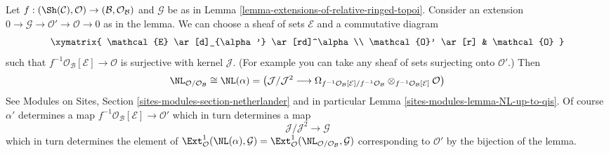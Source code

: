 \begin{remark}
\label{remark-extensions-of-relative-ringed-topoi}
Let $f : (\Sh(\mathcal{C}), \mathcal{O}) \to
(\mathcal{B}, \mathcal{O}_\mathcal{B})$ and $\mathcal{G}$
be as in Lemma \ref{lemma-extensions-of-relative-ringed-topoi}.
Consider an extension
$0 \to \mathcal{G} \to \mathcal{O}' \to \mathcal{O} \to 0$
as in the lemma. We can choose a sheaf of sets $\mathcal{E}$
and a commutative diagram
$$
\xymatrix{
\mathcal{E} \ar[d]_{\alpha'} \ar[rd]^\alpha \\
\mathcal{O}' \ar[r] & \mathcal{O}
}
$$
such that $f^{-1}\mathcal{O}_\mathcal{B}[\mathcal{E}] \to \mathcal{O}$
is surjective with kernel $\mathcal{J}$.
(For example you can take any sheaf of sets surjecting
onto $\mathcal{O}'$.) Then
$$
\NL_{\mathcal{O}/\mathcal{O}_\mathcal{B}} \cong \NL(\alpha) = 
\left(
\mathcal{J}/\mathcal{J}^2
\longrightarrow
\Omega_{f^{-1}\mathcal{O}_\mathcal{B}[\mathcal{E}]/
f^{-1}\mathcal{O}_\mathcal{B}}
\otimes_{f^{-1}\mathcal{O}_\mathcal{B}[\mathcal{E}]} \mathcal{O}\right)
$$
See Modules on Sites, Section \ref{sites-modules-section-netherlander}
and in particular Lemma \ref{sites-modules-lemma-NL-up-to-qis}.
Of course $\alpha'$ determines a map
$f^{-1}\mathcal{O}_\mathcal{B}[\mathcal{E}] \to \mathcal{O}'$
which in turn determines a map
$$
\mathcal{J}/\mathcal{J}^2 \longrightarrow \mathcal{G}
$$
which in turn determines the element of
$\Ext^1_\mathcal{O}(\NL(\alpha), \mathcal{G}) =
\Ext^1_\mathcal{O}(\NL_{\mathcal{O}/\mathcal{O}_\mathcal{B}}, \mathcal{G})$
corresponding to $\mathcal{O}'$ by the bijection of the lemma.
\end{remark}

